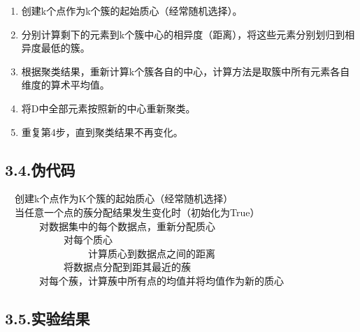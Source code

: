 \documentclass[a4paper, 12pt]{ctexart}
\begin{document}
\begin{enumerate}[noitemsep,topsep=\mdcompacttopsep]%

\item{}创建k个点作为k个簇的起始质心（经常随机选择）。%

\item{}分别计算剩下的元素到k个簇中心的相异度（距离），将这些元素分别划归到相异度最低的簇。%

\item{}根据聚类结果，重新计算k个簇各自的中心，计算方法是取簇中所有元素各自维度的算术平均值。%

\item{}将D中全部元素按照新的中心重新聚类。%

\item{}重复第4步，直到聚类结果不再变化。%
\end{enumerate}%

\subsection{3.4.\hspace*{0.5em}伪代码}\label{section}%
\begin{mdpre}%
\noindent~~创建k个点作为K个簇的起始质心（经常随机选择）\\
~~当任意一个点的蔟分配结果发生变化时（初始化为True）\\
~~~~~~~对数据集中的每个数据点，重新分配质心\\
~~~~~~~~~~~~对每个质心\\
~~~~~~~~~~~~~~~~~计算质心到数据点之间的距离\\
~~~~~~~~~~~~将数据点分配到距其最近的蔟\\
~~~~~~~对每个蔟，计算蔟中所有点的均值并将均值作为新的质心\\
\end{mdpre}
\subsection{3.5.\hspace*{0.5em}实验结果}\label{section}%
\end{document}
